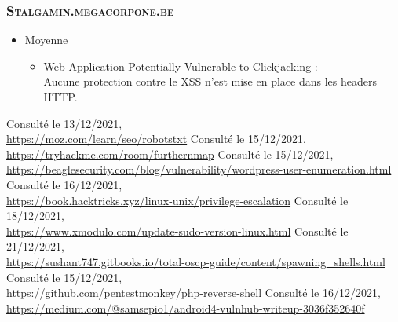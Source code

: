 \documentclass[a4paper]{article}
\begin{document}
\subsubsection{\textsc{Stalgamin.megacorpone.be}}\label{app:vulns7}

\begin{itemize}
    \item Moyenne
    \begin{itemize}
        \item Web Application Potentially Vulnerable to Clickjacking :\\
        Aucune protection contre le XSS n'est mise en place dans les headers HTTP.
    \end{itemize}
\end{itemize}






\newpage 
{} \listoffigures
\newpage 
{}

\begin{thebibliography}{9}
 Consulté le 13/12/2021,\\ {\small \url{https://moz.com/learn/seo/robotstxt}}
 Consulté le 15/12/2021,\\ {\small \url{https://tryhackme.com/room/furthernmap}}
 Consulté le 15/12/2021,\\ {\small \url{https://beaglesecurity.com/blog/vulnerability/wordpress-user-enumeration.html}}
 Consulté le 16/12/2021,\\ {\small \url{https://book.hacktricks.xyz/linux-unix/privilege-escalation}}
 Consulté le 18/12/2021,\\ {\small \url{https://www.xmodulo.com/update-sudo-version-linux.html}}
 Consulté le 21/12/2021,\\ {\small \url{https://sushant747.gitbooks.io/total-oscp-guide/content/spawning_shells.html}}
 Consulté le 15/12/2021,\\ {\small \url{https://github.com/pentestmonkey/php-reverse-shell}}
 Consulté le 16/12/2021,\\ {\small \url{https://medium.com/@samsepio1/android4-vulnhub-writeup-3036f352640f}}

\end{thebibliography}
\end{document}
